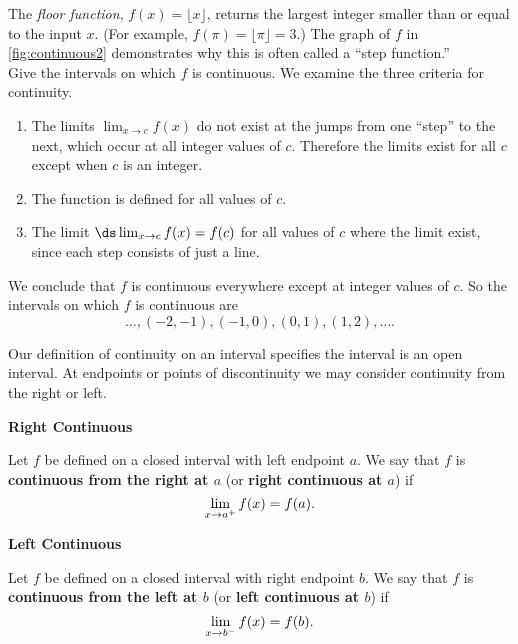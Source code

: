 \begin{example}\label{ex_contint2}
The \emph{floor function},
$f(x) = \lfloor x \rfloor$, returns the largest integer smaller than or equal to the input $x$. (For example, $f(\pi) = \lfloor \pi \rfloor = 3$.) The graph of $f$ in \autoref{fig:continuous2} demonstrates why this is often called a ``step function.'' \\
Give the intervals on which $f$ is continuous.
\solution
We examine the three criteria for continuity.
\begin{enumerate}
	\item	The limits $\lim_{x\to c} f(x)$ do not exist at the jumps from one ``step'' to the next, which occur at all integer values of $c$. Therefore the limits exist for all $c$ except when $c$ is an integer.
	\item	The function is defined for all values of $c$.
	\item	The limit $\ds \lim_{x\to c} f(x) = f(c)$ for all values of $c$ where the limit exist, since each step consists of just a line. 
\end{enumerate}
We conclude that $f$ is continuous everywhere except at integer values of $c$. So the intervals on which $f$ is continuous are
\[\dotsc, (-2,-1), (-1,0), (0,1), (1,2), \dotsc.\]
\end{example}

Our definition of continuity on an interval specifies the interval is an open interval. At endpoints or points of discontinuity we may consider continuity from the right or left.

\begin{definition}\label{def:left_right_cont}
\textbf{Right Continuous}

Let $f$ be defined on a closed interval with left endpoint $a$. We say that $f$ is \textbf{continuous from the right at $a$} (or \textbf{right continuous at $a$}) if  \[\lim_{x\to a^+} f(x)=f(a).\vspace{-\baselineskip}\]

\textbf{Left Continuous}

Let $f$ be defined on a closed interval with right endpoint $b$. We say that $f$ is \textbf{continuous from the left at $b$} (or \textbf{left continuous at $b$}) if
\[\lim_{x\to b^-} f(x)=f(b).\vspace{-\baselineskip}\]
\end{definition}

